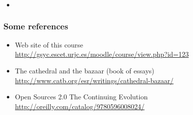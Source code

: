 
\begin{frame}
\frametitle{}

\begin{itemize}
\item 
\end{itemize}

\end{frame}



\begin{frame}
\frametitle{Some references}

\begin{itemize}
\item Web site of this course \\
  \url{http://gsyc.escet.urjc.es/moodle/course/view.php?id=123}
\item The cathedral and the bazaar (book of essays) \\
  \url{http://www.catb.org/esr/writings/cathedral-bazaar/}
\item Open Sources 2.0 The Continuing Evolution \\
  \url{http://oreilly.com/catalog/9780596008024/}
\end{itemize}

\end{frame}
